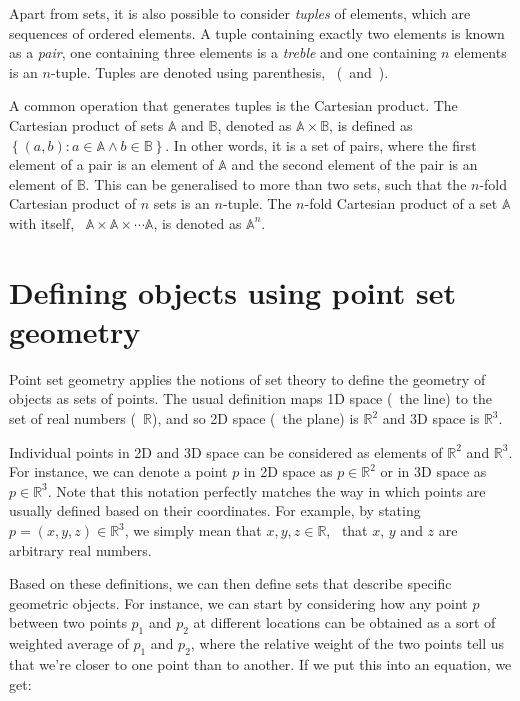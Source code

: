 Apart from sets, it is also possible to consider \emph{tuples} of elements, which are sequences of ordered elements.
A tuple containing exactly two elements is known as a \emph{pair}, one containing three elements is a \emph{treble} and one containing \(n\) elements is an \(n\)-tuple.
Tuples are denoted using parenthesis, \ie\ (\ and~).

A common operation that generates tuples is the Cartesian product.
The Cartesian product of sets \(\mathbb{A}\) and \(\mathbb{B}\), denoted as \(\mathbb{A} \times \mathbb{B}\), is defined as \(\left\{ (a,b) : a \in \mathbb{A} \wedge b \in \mathbb{B} \right\}\).
In other words, it is a set of pairs, where the first element of a pair is an element of \(\mathbb{A}\) and the second element of the pair is an element of \(\mathbb{B}\).
This can be generalised to more than two sets, such that the \(n\)-fold Cartesian product of \(n\) sets is an \(n\)-tuple.
The \(n\)-fold Cartesian product of a set \(\mathbb{A}\) with itself, \ie\ \(\mathbb{A} \times \mathbb{A} \times \cdots \mathbb{A}\), is denoted as \(\mathbb{A}^n\).

\section{Defining objects using point set geometry}%
\label{sec:ps}

Point set geometry applies the notions of set theory to define the geometry of objects as sets of points.
The usual definition maps 1D space (\ie\ the line) to the set of real numbers (\ie\ \(\mathbb{R}\)), and so 2D space (\ie\ the plane) is \(\mathbb{R}^2\) and 3D space is \(\mathbb{R}^3\).

Individual points in 2D and 3D space can be considered as elements of \(\mathbb{R}^2\) and \(\mathbb{R}^3\).
For instance, we can denote a point \(p\) in 2D space as \(p \in \mathbb{R}^2\) or in 3D space as \(p \in \mathbb{R}^3\).
Note that this notation perfectly matches the way in which points are usually defined based on their coordinates.
For example, by stating \(p = (x, y, z) \in \mathbb{R}^3\), we simply mean that \(x,y,z \in \mathbb{R} \), \ie\ that \(x\), \(y\) and \(z\) are arbitrary real numbers.

Based on these definitions, we can then define sets that describe specific geometric objects.
For instance, we can start by considering how any point \(p\) between two points \(p_1\) and \(p_2\) at different locations can be obtained as a sort of weighted average of \(p_1\) and \(p_2\), where the relative weight of the two points tell us that we're closer to one point than to another.
If we put this into an equation, we get:

